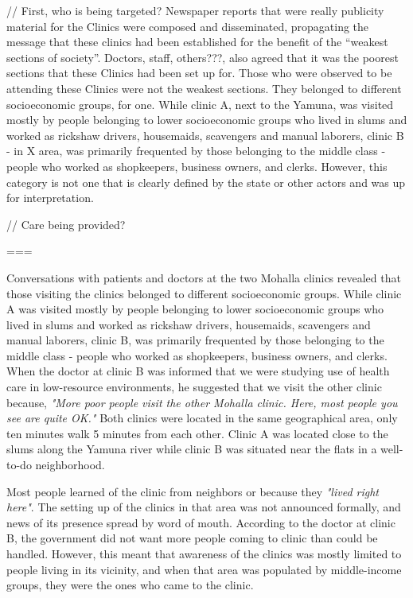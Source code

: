 //
First, who is being targeted? Newspaper reports that were really publicity material for the Clinics were composed and disseminated, propagating the message that these clinics had been established for the benefit of the ``weakest sections of society''. Doctors, staff, others???, also agreed that it was the poorest sections that these Clinics had been set up for. Those who were observed to be attending these Clinics were not the weakest sections. They belonged to different socioeconomic groups, for one. While clinic A, next to the Yamuna, was visited mostly by people belonging to lower socioeconomic groups who lived in slums and worked as rickshaw drivers, housemaids, scavengers and manual laborers, clinic B - in X area, was primarily frequented by those belonging to the middle class - people who worked as shopkeepers, business owners, and clerks. However, this category is not one that is clearly defined by the state or other actors and was up for interpretation. 

//
Care being provided?

===



Conversations with patients and doctors at the two Mohalla clinics revealed that those visiting the clinics belonged to different socioeconomic groups. While clinic A was visited mostly by people belonging to lower socioeconomic groups who lived in slums and worked as rickshaw drivers, housemaids, scavengers and manual laborers, clinic B, was primarily frequented by those belonging to the middle class - people who worked as shopkeepers, business owners, and clerks. When the doctor at clinic B was informed that we were studying use of health care in low-resource environments, he suggested that we visit the other clinic because,
\textit{"More poor people visit the other Mohalla clinic. Here, most people 
you see are quite OK."}    
% 
%
Both clinics were located in the same geographical area, only ten minutes walk 5 minutes from each other. Clinic A was located close to the slums along the Yamuna river while clinic B was situated near the flats in a well-to-do neighborhood. %

Most people learned of the clinic from neighbors or because they  \textit{"lived right here"}. The setting up of the clinics in that area was not announced formally, and news of its presence spread by word of mouth. According to the doctor at clinic B, the government did not want more people coming to clinic than could be handled. However, this meant that awareness of the clinics was mostly limited to people living in its vicinity, and when that area was populated by middle-income groups, they were the ones who came to the clinic.

